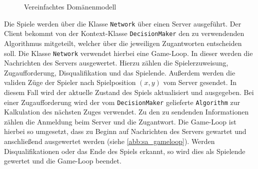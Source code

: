 \documentclass[12pt,a4paper,bibliography=totocnumbered,listof=totocnumbered]{article}
\begin{document}
\begin{figure}[h]
\centering
\resizebox{10cm}{!} {
}
\caption{Vereinfachtes Domänenmodell}
\label{abb:soft_arch}
\end{figure}

Die Spiele werden über die Klasse \texttt{Network} über einen Server ausgeführt. Der Client bekommt von der Kontext-Klasse \texttt{DecisionMaker} den zu verwendenden Algorithmus mitgeteilt, welcher über die jeweiligen Zugantworten entscheiden soll. Die Klasse \texttt{Network} verwendet hierbei eine Game-Loop. In dieser werden die Nachrichten des Servers ausgewertet. Hierzu zählen die Spielerzuweisung, Zugaufforderung, Disqualifikation und das Spielende. Außerdem werden die validen Züge der Spieler nach Spielposition $(x,y)$ vom Server gesendet. In diesem Fall wird der aktuelle Zustand des Spiels aktualisiert und ausgegeben. Bei einer Zugaufforderung wird der vom \texttt{DecisionMaker} gelieferte \texttt{Algorithm} zur Kalkulation des nächsten Zuges verwendet. Zu den zu sendenden Informationen zählen die Anmeldung beim Server und die Zugantwort. Die Game-Loop ist hierbei so umgesetzt, dass zu Beginn auf Nachrichten des Servers gewartet und anschließend ausgewertet werden (siehe \autoref{abb:sa_gameloop}). Werden Disqualifikationen oder das Ende des Spiels erkannt, so wird dies als Spielende gewertet und die Game-Loop beendet.
\end{document}

